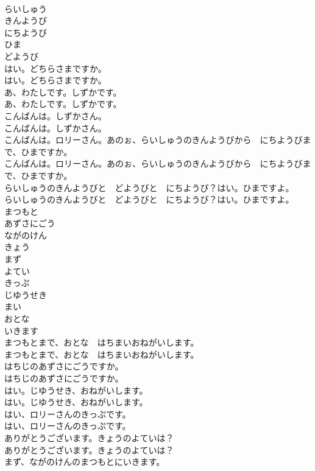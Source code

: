 \documentclass[8pt]{extreport}
\begin{document}
\begin{CJK}{UTF8}{min}
\\	らいしゅう
\\	きんようび
\\	にちようび
\\	ひま
\\	どようび
\\	はい。どちらさまですか。	
\\	はい。どちらさまですか。 
\\	あ、わたしです。しずかです。	
\\	あ、わたしです。しずかです。 
\\	こんばんは。しずかさん。	
\\	こんばんは。しずかさん。 
\\	こんばんは。ロリーさん。あのぉ、らいしゅうのきんようびから　にちようびまで、ひまですか。	
\\	こんばんは。ロリーさん。あのぉ、らいしゅうのきんようびから　にちようびまで、ひまですか。 
\\	らいしゅうのきんようびと　どようびと　にちようび？はい。ひまですよ。	
\\	らいしゅうのきんようびと　どようびと　にちようび？はい。ひまですよ。 
\\	まつもと
\\	あずさにごう
\\	ながのけん
\\	きょう
\\	まず
\\	よてい
\\	きっぷ
\\	じゆうせき
\\	まい
\\	おとな
\\	いきます
\\	まつもとまで、おとな　はちまいおねがいします。	
\\	まつもとまで、おとな　はちまいおねがいします。 
\\	はちじのあずさにごうですか。	
\\	はちじのあずさにごうですか。 
\\	はい。じゆうせき、おねがいします。	
\\	はい。じゆうせき、おねがいします。 
\\	はい、ロリーさんのきっぷです。	
\\	はい、ロリーさんのきっぷです。 
\\	ありがとうございます。きょうのよていは？	
\\	ありがとうございます。きょうのよていは？ 
\\	まず、ながのけんのまつもとにいきます。	

\end{CJK}
\end{document}
